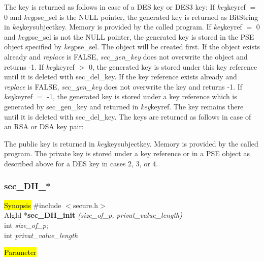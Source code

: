 The key is returned as follows in case of a DES key or DES3 key:
\be
\m If {\em key}\pf keyref $=$ 0 and {\em key}\pf pse\_sel is the NULL pointer, the generated key is
   returned as BitString in {\em key}\pf key\pf subjectkey. Memory is provided by the called program. 
\m If {\em key}\pf keyref $=$ 0 and {\em key}\pf pse\_sel is not the NULL pointer, the generated key
   is stored in the PSE object specified by {\em key}\pf pse\_sel.
   The object will be created first. If the object exists already and {\em replace} is FALSE, 
   {\em sec\_gen\_key} does not overwrite the object and returns -1.
\m If {\em key}\pf keyref $>$ 0, the generated key is stored under this key reference until it is
   deleted with sec\_del\_key.
   If the key reference exists already and {\em replace} is FALSE, {\em sec\_gen\_key}
   does not overwrite the key and returns -1.
\m If {\em key}\pf keyref $=$ -1, the generated key is stored under a key reference which is generated 
   by sec\_gen\_key and returned in {\em key}\pf keyref. The key remains there until it is deleted
   with sec\_del\_key.
\ee
The keys are returned as follows in case of an RSA or DSA key pair: 

The public key is returned in {\em key}\pf key\pf subjectkey. Memory is provided by the called program.
The private key is stored under a key reference or in a PSE object as described above for a DES key in 
cases 2, 3, or 4.

\subsubsection{sec\_DH\_*}
\label{sec_DH}
\hl{Synopsis}
\#include $<$secure.h$>$ \\ [0.5cm]
AlgId *{\bf sec\_DH\_init} {\em (size\_of\_p, privat\_value\_length)} \\
int {\em size\_of\_p};\\
int {\em privat\_value\_length}

\hl{Parameter}




